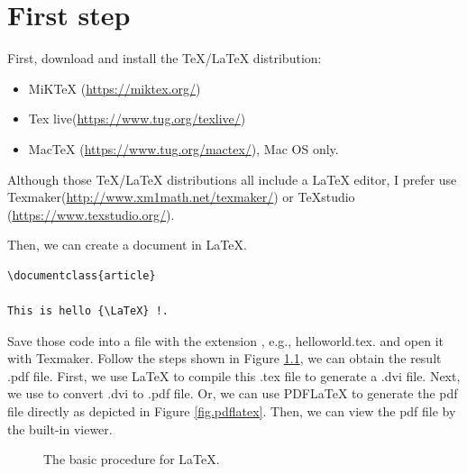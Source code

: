 \chapter{First step}
\label{intro}


First, download and install the {\TeX}/{\LaTeX} distribution:
\begin{itemize}
\item MiKTeX (\url{https://miktex.org/})
\item Tex live(\url{https://www.tug.org/texlive/})
\item MacTeX (\url{https://www.tug.org/mactex/}), Mac OS only.
\end{itemize}

Although those {\TeX}/{\LaTeX} distributions all include a {\LaTeX} editor, I prefer use Texmaker(\url{http://www.xm1math.net/texmaker/}) or TeXstudio (\url{https://www.texstudio.org/}).

Then, we can create a document in {\LaTeX}.

\begin{lstlisting}[language=Tex]
\documentclass{article}

This is hello {\LaTeX} !.

\end{lstlisting}

Save those code into a file with the extension , e.g., helloworld.tex. and open it with Texmaker.
Follow the steps shown in Figure \ref{fig.latex}, we can obtain the result .pdf file.
First, we use {\LaTeX} to compile this .tex file to generate a .dvi file.
Next, we use  to convert .dvi to .pdf file.
Or, we can use PDFLaTeX to generate the pdf file directly as depicted in Figure \ref{fig.pdflatex}.
Then, we can view the pdf file by the built-in viewer.


\begin{figure}[!t]
\centering
{}
\caption{The basic procedure for LaTeX.}%
\label{fig.latex}%
\end{figure}


